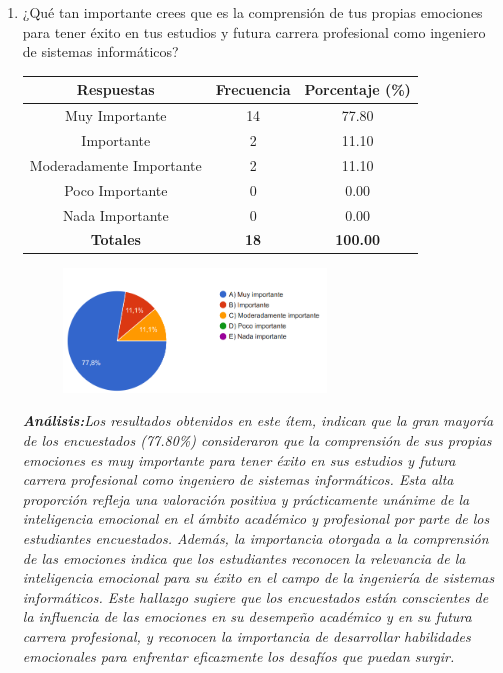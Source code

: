 \documentclass[journal]{IEEEtran}
\begin{document}
\begin{enumerate}
\item ¿Qué tan importante crees que es la comprensión de tus propias emociones para tener éxito en tus estudios y futura carrera profesional como ingeniero de sistemas informáticos?
	\begin{table}[H]
		\renewcommand{\arraystretch}{1.3}
		\centering
		\begin{tabular}{|c|c|c|}
			\hline
			\textbf{Respuestas} & \textbf{Frecuencia} & \textbf{Porcentaje (\%)}\\
			\hline
			Muy Importante & 14 & 77.80 \\
			Importante & 2 & 11.10 \\
			Moderadamente Importante & 2 & 11.10\\
			Poco Importante & 0 & 0.00\\
			Nada Importante & 0 & 0.00\\
			\hline
			\textbf{Totales} &\textbf{18}& \textbf{100.00}\\
			\hline
		\end{tabular}
	\end{table}
	\begin{figure}[h]
		\centering
		\includegraphics[width=07cm]{Pregunta 2}
	\end{figure}
	\textit{\textbf{Análisis:}Los resultados obtenidos en este ítem, indican que la gran mayoría de los encuestados (77.80\%) consideraron que la comprensión de sus propias emociones es muy importante para tener éxito en sus estudios y futura carrera profesional como ingeniero de sistemas informáticos. Esta alta proporción refleja una valoración positiva y prácticamente unánime de la inteligencia emocional en el ámbito académico y profesional por parte de los estudiantes encuestados.
Además, la importancia otorgada a la comprensión de las emociones indica que los estudiantes reconocen la relevancia de la inteligencia emocional para su éxito en el campo de la ingeniería de sistemas informáticos. Este hallazgo sugiere que los encuestados están conscientes de la influencia de las emociones en su desempeño académico y en su futura carrera profesional, y reconocen la importancia de desarrollar habilidades emocionales para enfrentar eficazmente los desafíos que puedan surgir.
}\\


\end{enumerate}
\end{document}
